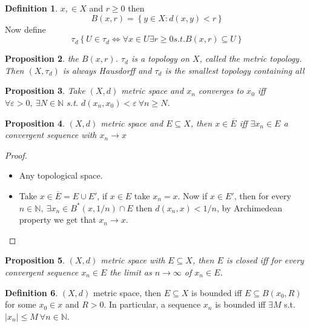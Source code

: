 \documentclass[11pt,a4paper]{article}
\theoremstyle{definition}
\newtheorem{definition}{Definition}[section]
\theoremstyle{plain}
\newtheorem{proposition}[definition]{Proposition}
\theoremstyle{remark}
\newcommand{\N}{\mathbb{N}}
\renewcommand{\set}[1]{\left\{ #1 \right\}}
\newcommand{\abs}[1]{\lvert #1 \rvert}
\newcommand{\1}{\mathbbm{1}}
\begin{document}
\begin{definition}
    $x, \in X$ and $r \ge 0$ then 
    $$B(x, r) = \set{y \in X \colon d(x, y) < r}$$ 
    Now define 
    $$\tau_d \set{U \in \tau_d \iff \forall x \in U \exists r \ge 0 s.t. B(x, r) \subseteq U}$$
\end{definition}

\begin{proposition}
    the $B(x, r)$. 
    $\tau_d$ is a topology on $X$, called the metric topology. Then $(X, \tau_d)$ is always Hausdorff and $\tau_d$ is the smallest topology containing all 
\end{proposition}

\begin{proposition}
    Take $(X, d)$ metric space and $x_n$ converges to $x_0$ iff $\forall \varepsilon > 0, \ \exists N \in \N$ s.t. $d(x_n, x_0) < \varepsilon \ \forall n \ge N$.
\end{proposition}

\begin{proposition}
    $(X, d)$ metric space and $E \subseteq X$, then $x \in \overline{E}$ iff $\exists x_n \in E$ a convergent sequence with $x_n \to x$ 
\end{proposition}

\begin{proof}
    \begin{itemize}
        \item[$(\impliedby)$] Any topological space. 
        \item[$(\implies$)] Take $x \in \overline{E} = E \cup E'$, if $x \in E$ take $x_n = x$. Now if $x \in E'$, then for every $n \in \N, \ \exists x_n \in B^*(x, 1/n) \cap E$ then 
        $d(x_n, x) < 1/n$, by Archimedean property we get that $x_n \to x$.
    \end{itemize}
\end{proof}

\begin{proposition}
    $(X, d)$ metric space with $E \subseteq X$, then $E$ is closed iff for every convergent sequence $x_n \in E$ the limit as $n \to \infty$ of $x_n \in E$.
\end{proposition}

\begin{definition}
    $(X, d)$ metric space, then $E \subseteq X$ is bounded iff $E \subseteq B(x_0, R)$ for some $x_0 \in x$ and $R > 0$. In particular, a sequence $x_n$ is bounded 
    iff $\exists M$ s.t. $\abs{x_n} \le M \ \forall n \in \N$.
\end{definition}
\end{document}
